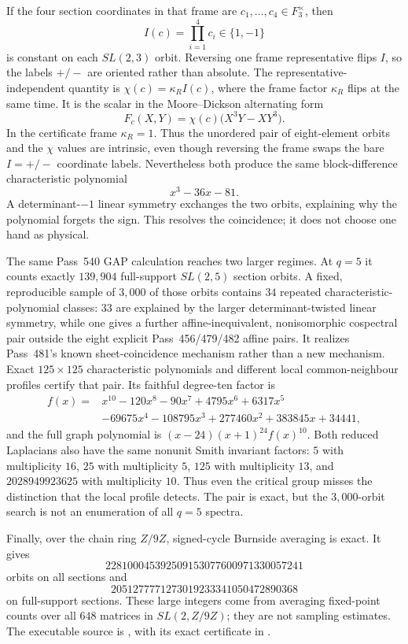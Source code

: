 \documentclass[11pt]{article}
\def\mathbb#1{#1}%
\begin{document}
If the four section coordinates in that frame are
$c_1,\ldots,c_4\in\mathbb F_3^\times$, then
\[
 I(c)=\prod_{i=1}^{4}c_i\in\{1,-1\}
\]
is constant on each $SL(2,3)$ orbit.  Reversing one frame representative flips
$I$, so the labels $+/-$ are oriented rather than absolute.  The
representative-independent quantity is $\chi(c)=\kappa_R I(c)$, where the
frame factor $\kappa_R$ flips at the same time.  It is the scalar in the
Moore--Dickson alternating form
\[
 F_c(X,Y)=\chi(c)\bigl(X^3Y-XY^3\bigr).
\]
In the certificate frame $\kappa_R=1$.  Thus the unordered pair of
eight-element orbits and the $\chi$ values are intrinsic, even though
reversing the frame swaps the bare $I=+/-$ coordinate labels.
Nevertheless both produce the same block-difference characteristic polynomial
\[
 x^3-36x-81.
\]
A determinant-$-1$ linear symmetry exchanges the two orbits, explaining why
the polynomial forgets the sign.  This resolves the coincidence; it does not
choose one hand as physical.

The same Pass~540 GAP calculation reaches two larger regimes.  At $q=5$ it
counts exactly $139{,}904$ full-support $SL(2,5)$ section orbits.  A fixed,
reproducible sample of $3{,}000$ of those orbits contains $34$ repeated
characteristic-polynomial classes: $33$ are explained by the larger
determinant-twisted linear symmetry, while one gives a further
affine-inequivalent, nonisomorphic cospectral pair outside the eight explicit
Pass~456/479/482 affine pairs.  It realizes Pass~481's known sheet-coincidence
mechanism rather than a new mechanism.  Exact $125\times125$ characteristic polynomials and different local
common-neighbour profiles certify that pair.  Its faithful degree-ten factor is
\[
\begin{aligned}
 f(x)={}&x^{10}-120x^8-90x^7+4795x^6+6317x^5\\
       &-69675x^4-108795x^3+277460x^2+383845x+34441,
\end{aligned}
\]
and the full graph polynomial is $(x-24)(x+1)^{24}f(x)^{10}$.
Both reduced Laplacians also have the same nonunit Smith invariant factors:
$5$ with multiplicity $16$, $25$ with multiplicity $5$, $125$ with
multiplicity $13$, and $2028949923625$ with multiplicity $10$.  Thus even the critical group misses
the distinction that the local profile detects.
The pair is exact, but the $3{,}000$-orbit search is not an enumeration of all
$q=5$ spectra.

Finally, over the chain ring $\mathbb Z/9\mathbb Z$, signed-cycle Burnside
averaging is exact.  It gives
\[
228100045392509153077600971330057241
\]
orbits on all sections and
\[
2051277771273019233341050472890368
\]
on full-support sections.  These large integers come from averaging fixed-point
counts over all $648$ matrices in $SL(2,\mathbb Z/9\mathbb Z)$; they are not
sampling estimates.  The executable source is
, with its exact
certificate in .
\end{document}
